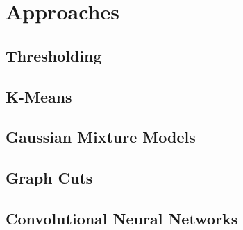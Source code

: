 \chapter{Approaches}

	\section{Thresholding}

	\section{K-Means}

	\section{Gaussian Mixture Models}

	\section{Graph Cuts}

	\section{Convolutional Neural Networks}